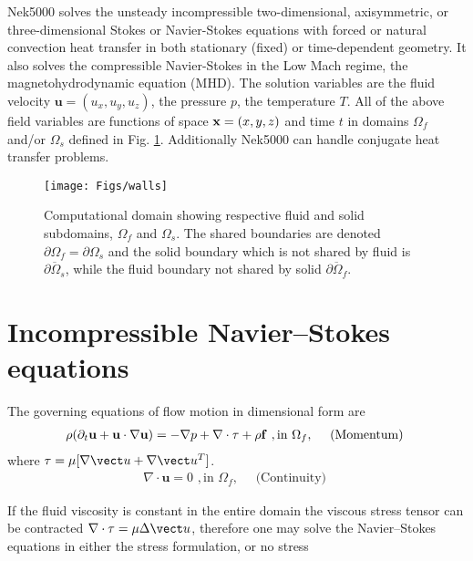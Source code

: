 Nek5000 solves the unsteady incompressible two-dimensional,
axisymmetric, or three-dimensional Stokes or Navier-Stokes
equations with forced or natural convection heat transfer in
both stationary (fixed) or time-dependent geometry. It also solves the compressible Navier-Stokes in the Low Mach regime, the magnetohydrodynamic equation (MHD).
The solution variables are the fluid velocity
\(\mathbf u=(u_{x},u_{y},u_{z})\), the pressure \(p\),
the temperature \(T\). 
All of the above field variables
are functions of space \({\bf x}=(x,y,z)\) and time \(t\)
in domains \(\Omega_f\) and/or \(\Omega_s\) defined in Fig. \ref{fig:domains}.
Additionally Nek5000 can handle conjugate heat transfer problems.

\begin{figure}
\centering
\texttt{[image: Figs/walls]}
\caption{Computational domain showing respective fluid
and solid subdomains, \(\Omega_f\) and \(\Omega_s\). The shared boundaries are denoted \(\partial\Omega_f=\partial\Omega_s\) and the solid boundary which is not shared by fluid is \(\overline{\partial\Omega_s}\), while the fluid boundary not shared by solid \(\overline{\partial\Omega_f}\).}
\label{fig:domains}
\end{figure}

\section{Incompressible Navier--Stokes equations}
%
The governing equations of flow motion in dimensional form are
\begin{eqnarray}\label{eq:ns_momentum}
\rho(\partial_{t} \mathbf u +\mathbf u \cdot \nabla \mathbf u) = - \nabla p + \nabla \cdot \tau + \rho {\bf f} \,\, , \text{in } \Omega_f , \quad \text{  (Momentum)  } 
\end{eqnarray}
where \( \tau=\mu[\nabla \vect u+\nabla \vect u^{T}]\).
\begin{eqnarray}\label{eq:ns_cont}
 \nabla \cdot \mathbf u =0 \,\, , \text{in } \Omega_f, \quad \text{  (Continuity)  }   
\end{eqnarray}

If the fluid viscosity is constant in the entire domain the viscous stress tensor can be contracted \(\nabla\cdot\tau=\mu\Delta \vect u\), therefore one may solve the Navier--Stokes equations in either the stress formulation, or no stress

